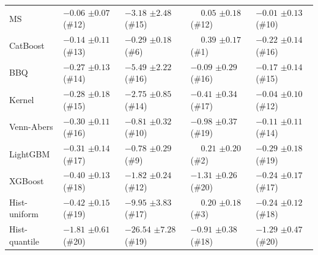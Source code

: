 \begin{tabular}{lllll}
MS & $-0.06$ {\tiny $\pm 0.07$} (\#12) & $-3.18$ {\tiny $\pm 2.48$} (\#15) & $\phantom{-}0.05$ {\tiny $\pm 0.18$} (\#12) & $-0.01$ {\tiny $\pm 0.13$} (\#10) \\
CatBoost & $-0.14$ {\tiny $\pm 0.11$} (\#13) & $-0.29$ {\tiny $\pm 0.18$} (\#6) & $\phantom{-}0.39$ {\tiny $\pm 0.17$} (\#1) & $-0.22$ {\tiny $\pm 0.14$} (\#16) \\
BBQ & $-0.27$ {\tiny $\pm 0.13$} (\#14) & $-5.49$ {\tiny $\pm 2.22$} (\#16) & $-0.09$ {\tiny $\pm 0.29$} (\#16) & $-0.17$ {\tiny $\pm 0.14$} (\#15) \\
Kernel & $-0.28$ {\tiny $\pm 0.18$} (\#15) & $-2.75$ {\tiny $\pm 0.85$} (\#14) & $-0.41$ {\tiny $\pm 0.34$} (\#17) & $-0.04$ {\tiny $\pm 0.10$} (\#12) \\
Venn-Abers & $-0.30$ {\tiny $\pm 0.11$} (\#16) & $-0.81$ {\tiny $\pm 0.32$} (\#10) & $-0.98$ {\tiny $\pm 0.37$} (\#19) & $-0.11$ {\tiny $\pm 0.11$} (\#14) \\
LightGBM & $-0.31$ {\tiny $\pm 0.14$} (\#17) & $-0.78$ {\tiny $\pm 0.29$} (\#9) & $\phantom{-}0.21$ {\tiny $\pm 0.20$} (\#2) & $-0.29$ {\tiny $\pm 0.18$} (\#19) \\
XGBoost & $-0.40$ {\tiny $\pm 0.13$} (\#18) & $-1.82$ {\tiny $\pm 0.24$} (\#12) & $-1.31$ {\tiny $\pm 0.26$} (\#20) & $-0.24$ {\tiny $\pm 0.17$} (\#17) \\
Hist-uniform & $-0.42$ {\tiny $\pm 0.15$} (\#19) & $-9.95$ {\tiny $\pm 3.83$} (\#17) & $\phantom{-}0.20$ {\tiny $\pm 0.18$} (\#3) & $-0.24$ {\tiny $\pm 0.12$} (\#18) \\
Hist-quantile & $-1.81$ {\tiny $\pm 0.61$} (\#20) & $-26.54$ {\tiny $\pm 7.28$} (\#19) & $-0.91$ {\tiny $\pm 0.38$} (\#18) & $-1.29$ {\tiny $\pm 0.47$} (\#20) \\
\bottomrule
\end{tabular}
